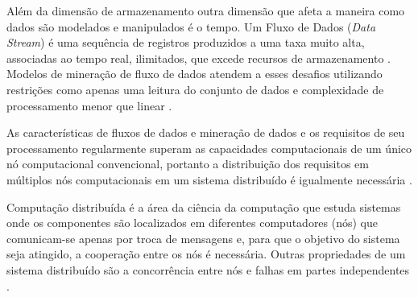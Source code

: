 Além da dimensão de armazenamento outra dimensão que afeta a maneira como dados
são modelados e manipulados é o tempo. Um Fluxo de Dados (\emph{Data Stream}) é
uma sequência de registros produzidos a uma taxa muito alta, associadas ao tempo
real, ilimitados, que excede recursos de armazenamento \cite{Gaber2005}.
Modelos de mineração de fluxo de dados atendem a esses desafios utilizando
restrições como apenas uma leitura do conjunto de dados e complexidade
de processamento menor que linear \cite{Gama2007, Gaber2005}.




As características de fluxos de dados e mineração de dados e os requisitos de
seu processamento regularmente superam as capacidades computacionais de um único
nó computacional convencional, portanto a distribuição dos requisitos em
múltiplos nós computacionais em um sistema distribuído é igualmente necessária
\cite{Gaber2005}.

Computação distribuída é a área da ciência da computação que estuda sistemas
onde os componentes são localizados em diferentes computadores (nós) que
comunicam-se apenas por troca de mensagens e, para que o objetivo do sistema
seja atingido, a cooperação entre os nós é necessária.
Outras propriedades de um sistema distribuído são a concorrência entre nós e
falhas em partes independentes \cite{TanenbaumSteen2018}.


 

